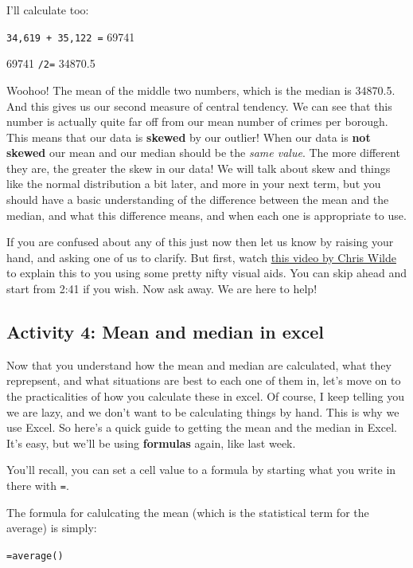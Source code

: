 \documentclass[]{book}
\theoremstyle{definition}
\theoremstyle{definition}
\theoremstyle{definition}
\theoremstyle{remark}
\begin{document}
I'll calculate too:

\texttt{34,619\ +\ 35,122\ =} 69741

69741 \texttt{/2=} 34870.5

Woohoo! The mean of the middle two numbers, which is the median is
34870.5. And this gives us our second measure of central tendency. We
can see that this number is actually quite far off from our mean number
of crimes per borough. This means that our data is \textbf{skewed} by
our outlier! When our data is \textbf{not skewed} our mean and our
median should be the \emph{same value}. The more different they are, the
greater the skew in our data! We will talk about skew and things like
the normal distribution a bit later, and more in your next term, but you
should have a basic understanding of the difference between the mean and
the median, and what this difference means, and when each one is
appropriate to use.

If you are confused about any of this just now then let us know by
raising your hand, and asking one of us to clarify. But first, watch
\href{https://www.youtube.com/watch?v=U3lk2nQYfAQ\&amp=\&list=PL8CRAVedURQrlxeFfme0TEgaj1_h67JUR\&amp=\&index=4}{this
video by Chris Wilde} to explain this to you using some pretty nifty
visual aids. You can skip ahead and start from 2:41 if you wish. Now ask
away. We are here to help!

\hypertarget{activity-4-mean-and-median-in-excel}{%
\subsection{Activity 4: Mean and median in
excel}\label{activity-4-mean-and-median-in-excel}}

Now that you understand how the mean and median are calculated, what
they reprepsent, and what situations are best to each one of them in,
let's move on to the practicalities of how you calculate these in excel.
Of course, I keep telling you we are lazy, and we don't want to be
calculating things by hand. This is why we use Excel. So here's a quick
guide to getting the mean and the median in Excel. It's easy, but we'll
be using \textbf{formulas} again, like last week.

You'll recall, you can set a cell value to a formula by starting what
you write in there with \texttt{=}.

The formula for calulcating the mean (which is the statistical term for
the average) is simply:

\texttt{=average()}
\end{document}
